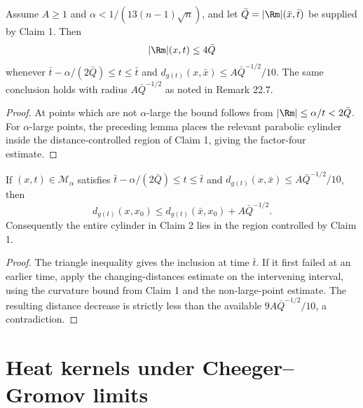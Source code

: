 \begin{claim}
\label{clm:chow-iii-point-picking-claim-two}
Assume \(A\ge1\) and \(\alpha<1/(13(n-1)\sqrt n)\), and let
\(\bar Q=|\Rm|(\bar x,\bar t)\) be supplied by Claim 1.  Then
\[
 |\Rm|(x,t)\le4\bar Q
\]
whenever \(\bar t-\alpha/(2\bar Q)\le t\le\bar t\) and
\(d_{g(t)}(x,\bar x)\le A\bar Q^{-1/2}/10\).  The same conclusion holds
with radius \(A\bar Q^{-1/2}\) as noted in Remark 22.7.
\end{claim}
\begin{proof}
\sketch At points which are not \(\alpha\)-large the bound follows from
\(|\Rm|\le\alpha/t<2\bar Q\).  For \(\alpha\)-large points, the preceding
lemma places the relevant parabolic cylinder inside the distance-controlled
region of Claim 1, giving the factor-four estimate.
\end{proof}

\begin{lemma}
\label{lem:chow-iii-point-picking-local-cylinder}
If \((x,t)\in\mathcal M_\alpha\) satisfies
\(\bar t-\alpha/(2\bar Q)\le t\le\bar t\) and
\(d_{g(t)}(x,\bar x)\le A\bar Q^{-1/2}/10\), then
\[
 d_{g(t)}(x,x_0)\le d_{g(t)}(\bar x,x_0)+A\bar Q^{-1/2}.
\]
Consequently the entire cylinder in Claim 2 lies in the region controlled by
Claim 1.
\end{lemma}
\begin{proof}
\sketch The triangle inequality gives the inclusion at time \(\bar t\).  If it first
failed at an earlier time, apply the changing-distances estimate on the
intervening interval, using the curvature bound from Claim 1 and the
non-large-point estimate.  The resulting distance decrease is strictly less
than the available \(9A\bar Q^{-1/2}/10\), a contradiction.
\end{proof}

\section{Heat kernels under Cheeger--Gromov limits}

